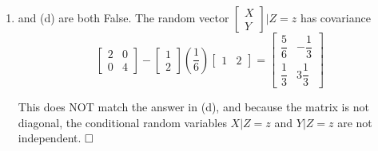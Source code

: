 \documentclass[letterpaper]{article}
\begin{document}
\begin{enumerate}
\begin{enumerate}
\item  and (d) are both False. The random vector $\begin{bmatrix} X \\ Y\end{bmatrix} | Z = z$ has covariance
$$\left[\begin{array}{cc} 2 & 0 \\ 0 & 4 \end{array}\right] - \begin{bmatrix} 1 \\ 2 \end{bmatrix} (\frac{1}{6}) \left[\begin{array}{cc} 1 & 2 \end{array} \right] = \left[\begin{array}{cc} \dfrac{5}{6} & -\dfrac{1}{3} \\[2ex] \dfrac{1}{3} & 3\dfrac{1}{3} \end{array} \right]$$

This does NOT match the answer in (d), and because the matrix is not diagonal, the conditional random variables $X|Z = z$ and $Y|Z = z$ are not independent.
$\hfill \square$
\end{enumerate}


\end{enumerate}
\end{document}
